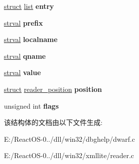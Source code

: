 \begin{DoxyCompactItemize}
\begin{tabbing}
\end{tabbing}\item 
\mbox{\label{structattribute_a73542f55f32d24852b91b34a3d31fad7}} 
\hyperlink{interfacestruct}{struct} \hyperlink{classlist}{list} {\bfseries entry}
\item 
\mbox{\label{structattribute_a111ed084420080d0b417f8e908b3a622}} 
\hyperlink{structstrval}{strval} {\bfseries prefix}
\item 
\mbox{\label{structattribute_a055045857306c65a38bb23f8f216ea8e}} 
\hyperlink{structstrval}{strval} {\bfseries localname}
\item 
\mbox{\label{structattribute_a0a24f95105bd5aa3144291b0def5e3a1}} 
\hyperlink{structstrval}{strval} {\bfseries qname}
\item 
\mbox{\label{structattribute_a7b7d58218f0f8bd494ee122e1f499253}} 
\hyperlink{structstrval}{strval} {\bfseries value}
\item 
\mbox{\label{structattribute_a20dab072db026048fc228af310205cc6}} 
\hyperlink{interfacestruct}{struct} \hyperlink{structreader__position}{reader\+\_\+position} {\bfseries position}
\item 
\mbox{\label{structattribute_a023086ff526d06d873a97e5dbe9fcd05}} 
unsigned int {\bfseries flags}
\end{DoxyCompactItemize}


该结构体的文档由以下文件生成\+:\begin{DoxyCompactItemize}
\item 
E\+:/\+React\+O\+S-\/0../dll/win32/dbghelp/dwarf.\+c\item 
E\+:/\+React\+O\+S-\/0../dll/win32/xmllite/reader.\+c\end{DoxyCompactItemize}
